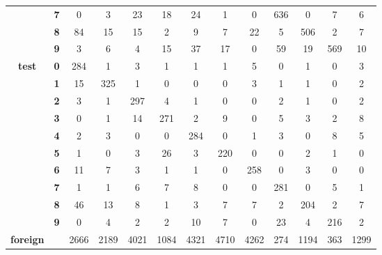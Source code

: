 \begin{table}[htp]
\begin{tabular}{|c|c|c|c|c|c|c|c|c|c|c|c|c|}
		& \textbf{7} & 0          & 3          & 23         & 18         & 24         & 1          & 0          & 636        & 0          & 7          & 6                \\ \cline{2-13} 
		& \textbf{8} & 84         & 15         & 15         & 2          & 9          & 7          & 22         & 5          & 506        & 2          & 7                \\ \cline{2-13} 
		& \textbf{9} & 3          & 6          & 4          & 15         & 37         & 17         & 0          & 59         & 19         & 569        & 10               \\ \hline
		\multirow{10}{*}{\textbf{test}}     & \textbf{0} & 284        & 1          & 3          & 1          & 1          & 1          & 5          & 0          & 1          & 0          & 3                \\ \cline{2-13} 
		& \textbf{1} & 15         & 325        & 1          & 0          & 0          & 0          & 3          & 1          & 1          & 0          & 2                \\ \cline{2-13} 
		& \textbf{2} & 3          & 1          & 297        & 4          & 1          & 0          & 0          & 2          & 1          & 0          & 2                \\ \cline{2-13} 
		& \textbf{3} & 0          & 1          & 14         & 271        & 2          & 9          & 0          & 5          & 3          & 2          & 8                \\ \cline{2-13} 
		& \textbf{4} & 2          & 3          & 0          & 0          & 284        & 0          & 1          & 3          & 0          & 8          & 5                \\ \cline{2-13} 
		& \textbf{5} & 1          & 0          & 3          & 26         & 3          & 220        & 0          & 0          & 2          & 1          & 0                \\ \cline{2-13} 
		& \textbf{6} & 11         & 7          & 3          & 1          & 1          & 0          & 258        & 0          & 3          & 0          & 0                \\ \cline{2-13} 
		& \textbf{7} & 1          & 1          & 6          & 7          & 8          & 0          & 0          & 281        & 0          & 5          & 1                \\ \cline{2-13} 
		& \textbf{8} & 46         & 13         & 8          & 1          & 3          & 7          & 7          & 2          & 204        & 2          & 7                \\ \cline{2-13} 
		& \textbf{9} & 0          & 4          & 2          & 2          & 10         & 7          & 0          & 23         & 4          & 216        & 2                \\ \hline
		\textbf{foreign}                    & \textbf{}  & 2666       & 2189       & 4021       & 1084       & 4321       & 4710       & 4262       & 274        & 1194       & 363        & 1299             \\ \hline
	\end{tabular}
\end{table}


